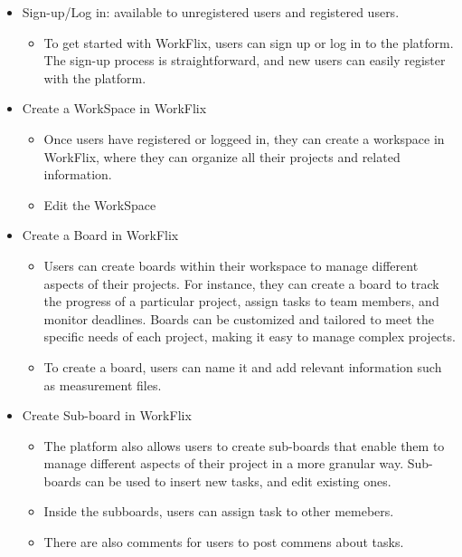 \begin{itemize}
    \item Sign-up/Log in: available to unregistered users and registered users. 
    \begin{itemize}
        \item To get started with WorkFlix, users can sign up or log in to the platform. The sign-up process is straightforward, and new users can easily register with the platform. \\
    \end{itemize}
    \item Create a WorkSpace in WorkFlix
    \begin{itemize}
        \item Once users have registered or loggeed in, they can create a workspace in WorkFlix, where they can organize all their projects and related information.
        \item Edit the WorkSpace
           \end{itemize}
    \item Create a Board in WorkFlix
    \begin{itemize}
        \item Users can create boards within their workspace to manage different aspects of their projects. For instance, they can create a board to track the progress of a particular project, assign tasks to team members, and monitor deadlines. Boards can be customized and tailored to meet the specific needs of each project, making it easy to manage complex projects.\\
        \item To create a board, users can name it and add relevant information such as measurement files. \\

    \end{itemize}
    \item Create Sub-board in WorkFlix
    \begin{itemize}
        \item The platform also allows users to create sub-boards that enable them to manage different aspects of their project in a more granular way. Sub-boards can be used to insert new tasks, and edit existing ones.\\
        \item Inside the subboards, users can assign task to other memebers. 
        \item There are also comments for users to post commens about tasks. 
    \end{itemize}
\end{itemize}


